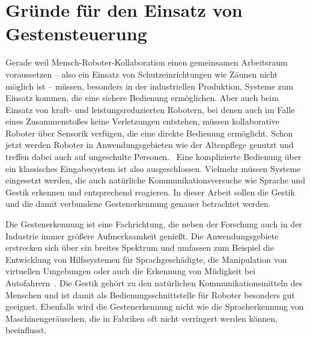 \section{Gründe für den Einsatz von Gestensteuerung}
Gerade weil Mensch-Roboter-Kollaboration einen gemeinsamen Arbeitsraum voraussetzen -- also ein Einsatz von Schutzeinrichtungen wie Zäunen nicht möglich ist -- müssen, besonders in der industriellen Produktion, Systeme zum Einsatz kommen, die eine sichere Bedienung ermöglichen. Aber auch beim Einsatz von kraft- und leistungsreduzierten Robotern, bei denen auch im Falle eines Zusammenstoßes keine Verletzungen entstehen, müssen kollaborative Roboter über Sensorik verfügen, die eine direkte Bedienung ermöglicht. Schon jetzt werden Roboter in Anwendungsgebieten wie der Altenpflege genutzt und treffen dabei auch auf ungeschulte Personen.~\cite{fraunhoferMRK} Eine komplizierte Bedienung über ein klassisches Eingabesystem ist also ausgeschlossen. Vielmehr müssen Systeme eingesetzt werden, die auch natürliche Kommunikationsversuche wie Sprache und Gestik erkennen und entsprechend reagieren. In dieser Arbeit sollen die Gestik und die damit verbundene Gestenerkennung genauer betrachtet werden.

Die Gestenerkennung ist eine Fachrichtung, die neben der Forschung auch in der Industrie immer größere Aufmerksamkeit genießt. Die Anwendungsgebiete erstrecken sich über ein breites Spektrum und umfassen zum Beispiel die Entwicklung von Hilfssystemen für Sprachgeschädigte, die Manipulation von virtuellen Umgebungen oder auch die Erkennung von Müdigkeit bei Autofahrern~\cite{recognitionSurvey}. Die Gestik gehört zu den natürlichen Kommunikationsmitteln des Menschen und ist damit als Bedienungsschnittstelle für Roboter besonders gut geeignet. Ebenfalls wird die Gestenerkennung nicht wie die Spracherkennung von Maschinengeräuschen, die in Fabriken oft nicht verringert werden können, beeinflusst.